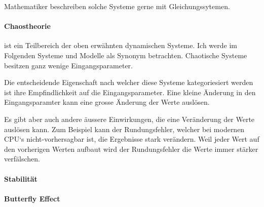 \documentclass[chaostheorie/chaostheorie.tex]{subfiles}
\begin{document}
	Mathematiker beschreiben solche Systeme gerne mit Gleichungssytemen.
	
	\paragraph{Chaostheorie} ist ein Teilbereich der oben erwähnten dynamischen Systeme. Ich werde im Folgenden Systeme und Modelle als Synonym betrachten. Chaotische Systeme besitzen ganz wenige Eingangsparameter.
	
	Die entscheidende Eigenschaft nach welcher diese Systeme kategoriesiert werden ist ihre Empfindlichkeit auf die Eingangsparameter. Eine kleine Änderung in den Eingangsparamter kann eine grosse Änderung der Werte auslösen.
	
	Es gibt aber auch andere äussere Einwirkungen, die eine Veränderung der Werte auslösen kann. Zum Beispiel kann der Rundungsfehler, welcher bei modernen CPU‘s nicht-vorhersagbar ist, die Ergebnisse stark verändern. Weil jeder Wert auf den vorherigen Werten aufbaut wird der Rundungsfehler die Werte immer stärker verfälschen.
	
	\paragraph{Stabilität}
	\paragraph{Butterfly Effect}
	
\end{document}
